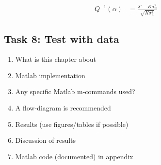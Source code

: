 \begin{align}
    Q^{-1}(\alpha) & = \frac{\lambda'-K\sigma_w^2}{\sqrt{K\sigma_w^4}}
    
\end{align}

\subsection{Task 8: Test with data}

\begin{enumerate}[i]
    \item What is this chapter about
    \item Matlab implementation
    \item Any specific Matlab m-commands used?
    \item A flow-diagram is recommended
    \item Results (use figures/tables if possible)
    \item Discussion of results
    \item Matlab code (documented) in appendix
\end{enumerate}





